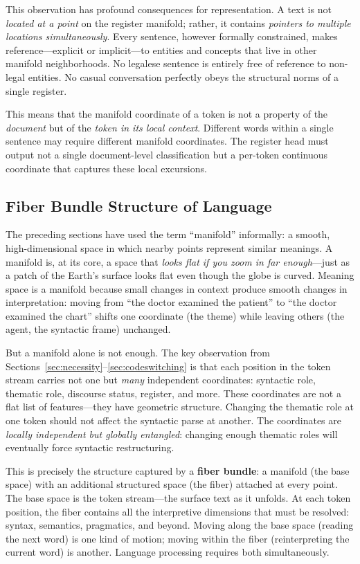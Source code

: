 \documentclass[11pt]{article}
\begin{document}
This observation has profound consequences for representation. A text is not 
\emph{located at a point} on the register manifold; rather, it contains 
\emph{pointers to multiple locations simultaneously}. Every sentence, however 
formally constrained, makes reference---explicit or implicit---to entities and 
concepts that live in other manifold neighborhoods. No legalese sentence is 
entirely free of reference to non-legal entities. No casual conversation 
perfectly obeys the structural norms of a single register.

This means that the manifold coordinate of a token is not a property of the 
\emph{document} but of the \emph{token in its local context}. Different words 
within a single sentence may require different manifold coordinates. The 
register head must output not a single document-level classification but a 
per-token continuous coordinate that captures these local excursions.

\subsection{Fiber Bundle Structure of Language}
\label{sec:fiberbundle}

The preceding sections have used the term ``manifold'' informally: a 
smooth, high-dimensional space in which nearby points represent similar 
meanings. A manifold is, at its core, a space that \emph{looks flat if 
you zoom in far enough}---just as a patch of the Earth's surface looks 
flat even though the globe is curved. Meaning space is a manifold because 
small changes in context produce smooth changes in interpretation: moving 
from ``the doctor examined the patient'' to ``the doctor examined the 
chart'' shifts one coordinate (the theme) while leaving others (the agent, 
the syntactic frame) unchanged.

But a manifold alone is not enough. The key observation from 
Sections~\ref{sec:necessity}--\ref{sec:codeswitching} is that each 
position in the token stream carries not one but \emph{many} independent 
coordinates: syntactic role, thematic role, discourse status, register, 
and more. These coordinates are not a flat list of features---they have 
geometric structure. Changing the thematic role at one token should not 
affect the syntactic parse at another. The coordinates are \emph{locally 
independent but globally entangled}: changing enough thematic roles will 
eventually force syntactic restructuring.

This is precisely the structure captured by a \textbf{fiber bundle}: a 
manifold (the base space) with an additional structured space (the fiber) 
attached at every point. The base space is the token stream---the 
surface text as it unfolds. At each token position, the fiber contains 
all the interpretive dimensions that must be resolved: syntax, semantics, 
pragmatics, and beyond. Moving along the base space (reading the next 
word) is one kind of motion; moving within the fiber (reinterpreting the 
current word) is another. Language processing requires both simultaneously.
\end{document}
